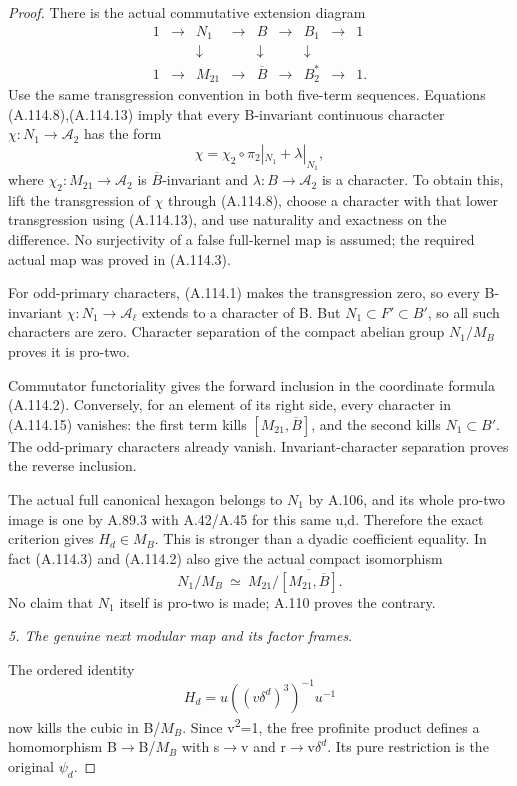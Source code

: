 \begin{proof}
There is the actual commutative extension diagram
\[
\begin{array}{ccccccccc}
1&\to&N_1&\to&B&\to&B_1&\to&1\\
 &&\downarrow&&\downarrow&&\downarrow\\
1&\to&M_{21}&\to&\overline B&\to&B_2^*&\to&1 .
\end{array}                                                  \tag{A.114.14}
\]
Use the same transgression convention in both five-term sequences. Equations (A.114.8),(A.114.13) imply that every B-invariant continuous character \(\chi:N_1\to\mathcal A_2\) has the form
\[
\chi=\chi_2\circ\pi_2|_{N_1}+\lambda|_{N_1},                  \tag{A.114.15}
\]
where \(\chi_2:M_{21}\to\mathcal A_2\) is \(\overline B\)-invariant and \(\lambda:B\to\mathcal A_2\) is a character. To obtain this, lift the transgression of \(\chi\) through (A.114.8), choose a character with that lower transgression using (A.114.13), and use naturality and exactness on the difference. No surjectivity of a false full-kernel map is assumed; the required actual map was proved in (A.114.3).

For odd-primary characters, (A.114.1) makes the transgression zero, so every B-invariant \(\chi:N_1\to\mathcal A_\ell\) extends to a character of B. But \(N_1\subset F'\subset B'\), so all such characters are zero. Character separation of the compact abelian group \(N_1/M_B\) proves it is pro-two.

Commutator functoriality gives the forward inclusion in the coordinate formula (A.114.2). Conversely, for an element of its right side, every character in (A.114.15) vanishes: the first term kills \([M_{21},\overline B]\), and the second kills \(N_1\subset B'\). The odd-primary characters already vanish. Invariant-character separation proves the reverse inclusion.

The actual full canonical hexagon belongs to \(N_1\) by A.106, and its whole pro-two image is one by A.89.3 with A.42/A.45 for this same u,d. Therefore the exact criterion gives \(H_d\in M_B\). This is stronger than a dyadic coefficient equality. In fact (A.114.3) and (A.114.2) also give the actual compact isomorphism
\[
N_1/M_B\ \simeq\ 
M_{21}/\overline{[M_{21},\overline B]}.
\]
No claim that \(N_1\) itself is pro-two is made; A.110 proves the contrary.

\medskip\noindent\emph{5. The genuine next modular map and its factor frames}.

The ordered identity
\[
H_d=u((v\delta^d)^3)^{-1}u^{-1}
\]
now kills the cubic in B/\(M_B\). Since v\textsuperscript{2}=1, the free profinite product defines a homomorphism B\(\to\)B/\(M_B\) with s\(\to\)v and r\(\to\)v\(\delta^d\). Its pure restriction is the original \(\psi_d\).


\end{proof}
